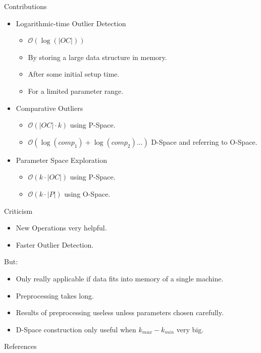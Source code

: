 \documentclass{beamer}
\begin{document}
    \begin{frame}{Contributions}
        \begin{itemize}
            \item Logarithmic-time Outlier Detection 
               \begin{itemize}
                   \item $\mathcal{O}(\log(|OC|))$
                    \item By storing a large data structure in memory.
                    \item After some initial setup time.
                    \item For a limited parameter range.
                \end{itemize}
           \item Comparative Outliers
                \begin{itemize}
                    \item $\mathcal{O}(|OC| \cdot k)$ using P-Space.
                    \item  $\mathcal{O}(\log(comp_1)+\log(comp_2)\ldots)$ D-Space and referring to O-Space.
                \end{itemize}
            \item Parameter Space Exploration
                    \begin{itemize}
                    \item $\mathcal{O}(k\cdot |OC|)$ using P-Space.
                    \item $\mathcal{O}(k\cdot |P|)$ using O-Space.
                   \end{itemize}
        \end{itemize}
    \end{frame}
\begin{frame}{Criticism}
\begin{itemize}
\item New Operations very helpful.
\item Faster Outlier Detection. 
\end{itemize}
But:
\begin{itemize}
\item Only really applicable if data fits into memory of a single machine.
\item Preprocessing takes long.
\item Results of preprocessing useless unless parameters chosen carefully.
\item D-Space construction only useful when $k_{max} - k_{min}$ very big.
\end{itemize}
\end{frame}
\appendix
\begin{frame}{References}
\nocite{onion,dolphin,parallel_knn,kriegeldefinitions}
\def\newblock{}


\end{frame}    
\end{document}

